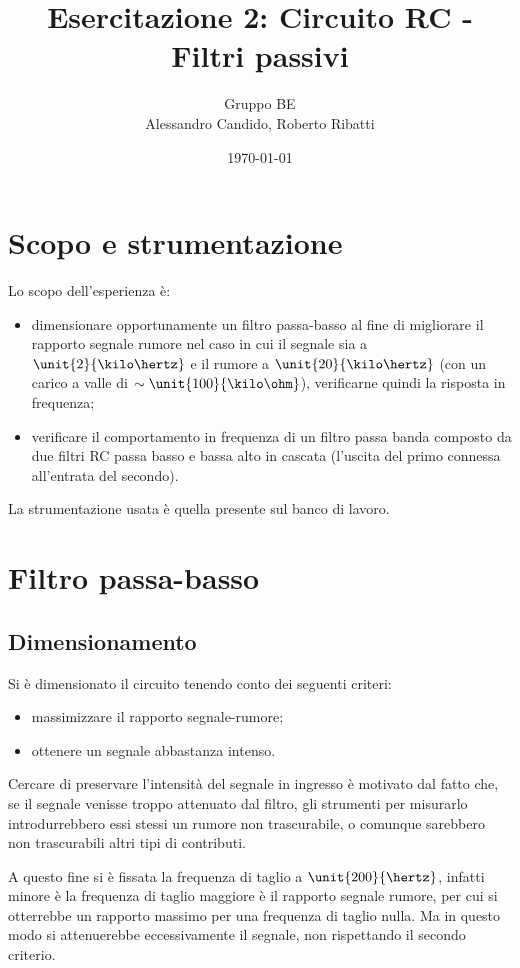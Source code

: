 \documentclass[10pt,a4paper]{article}
\title{Esercitazione 2: Circuito RC - Filtri passivi}
\author{Gruppo BE \\ Alessandro Candido, Roberto Ribatti}
\date{\today}
\begin{document}
\maketitle

\section{Scopo e strumentazione}
Lo scopo dell'esperienza è:
\begin{itemize}
\item dimensionare opportunamente un filtro passa-basso al fine di migliorare il rapporto segnale rumore nel caso in cui il segnale sia a $\unit{2}{\kilo\hertz}$ e il rumore a $\unit{20}{\kilo\hertz}$ (con un carico a valle di $\sim \unit{100}{\kilo\ohm}$), verificarne quindi la risposta in frequenza;
\item verificare il comportamento in frequenza di un filtro passa banda composto da due filtri RC passa basso e bassa alto in cascata (l'uscita del primo connessa all'entrata del secondo).
\end{itemize}

La strumentazione usata è quella presente sul banco di lavoro.

\section{Filtro passa-basso}

\subsection{Dimensionamento}
Si è dimensionato il circuito tenendo conto dei seguenti criteri:
\begin{itemize}
\item massimizzare il rapporto segnale-rumore;
\item ottenere un segnale abbastanza intenso.
\end{itemize}
Cercare di preservare l'intensità del segnale in ingresso è motivato dal fatto che, se il segnale venisse troppo attenuato dal filtro, gli strumenti per misurarlo introdurrebbero essi stessi un rumore non trascurabile, o comunque sarebbero non trascurabili altri tipi di contributi.

A questo fine si è fissata la frequenza di taglio a $\unit{200}{\hertz}$, infatti minore è la frequenza di taglio maggiore è il rapporto segnale rumore, per cui si otterrebbe un rapporto massimo per una frequenza di taglio nulla. Ma in questo modo si attenuerebbe eccessivamente il segnale, non rispettando il secondo criterio.
\end{document}
